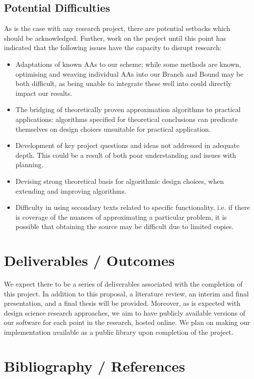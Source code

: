 \documentclass[12pt, a4paper]{article}
\begin{document}
\subsection{Potential Difficulties}
As is the case with any research project, there are potential setbacks which should be acknowledged. Further, work on the project until this point has indicated that the following issues have the capacity to disrupt research:
\begin{itemize}
  \item Adaptations of known AAs to our scheme; while some methods are known, optimising and weaving individual AAs into our Branch and Bound may be both difficult, as being unable to integrate these well into could directly impact our results.
  \item The bridging of theoretically proven approximation algorithms to practical applications: algorithms specified for theoretical conclusions can predicate themselves on design choices unsuitable for practical application.
  \item Development of key project questions and ideas not addressed in adequate depth. This could be a result of both poor understanding and issues with planning.
  \item Devising strong theoretical basis for algorithmic design choices, when extending and improving algorithms.
  \item Difficulty in using secondary texts related to specific functionality, i.e. if there is coverage of the nuances of approximating a particular problem, it is possible that obtaining the source may be difficult due to limited copies.
\end{itemize}

\section{Deliverables / Outcomes}
We expect there to be a series of deliverables associated with the completion of this project. In addition to this proposal, a literature review, an interim and final presentation, and a final thesis will be provided. Moreover, as is expected with design science research approaches, we aim to have publicly available versions of our software for each point in the research, hosted online. We plan on making our implementation available as a public library upon completion of the project. 

\section{Bibliography / References}


\end{document}
